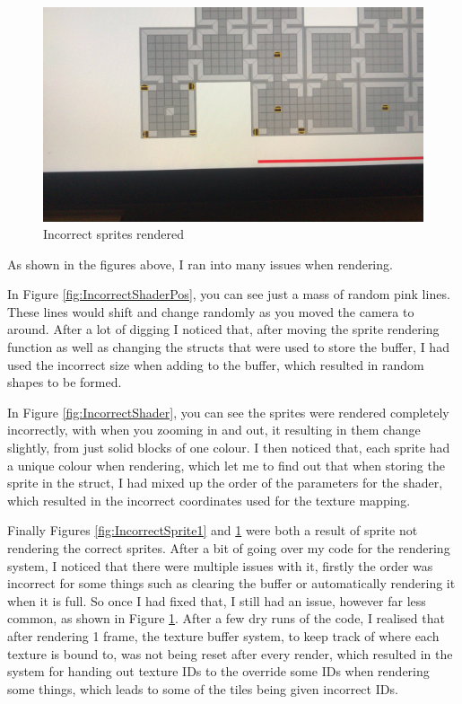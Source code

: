 \documentclass[../Main.tex]{subfiles}
\begin{document}
            \clearpage
            \begin{figure}[hbt!]
                \centerline{\includegraphics[scale=0.09]{img/Testing/General/Not refreshing buffer.jpg}}
                \caption{Incorrect sprites rendered}
                \label{fig:IncorrectSprite2}
            \end{figure}
            As shown in the figures above, I ran into many issues when rendering.

            In Figure \ref{fig:IncorrectShaderPos}, you can see just a mass of random pink lines. These lines would shift and change randomly as you moved the camera to around. After a lot of digging I noticed that, after moving the sprite rendering function as well as changing the structs that were used to store the buffer, I had used the incorrect size when adding to the buffer, which resulted in random shapes to be formed.

            In Figure \ref{fig:IncorrectShader}, you can see the sprites were rendered completely incorrectly, with when you zooming in and out, it resulting in them change slightly, from just solid blocks of one colour. I then noticed that, each sprite had a unique colour when rendering, which let me to find out that when storing the sprite in the struct, I had mixed up the order of the parameters for the shader, which resulted in the incorrect coordinates used for the texture mapping.

            Finally Figures \ref{fig:IncorrectSprite1} and \ref{fig:IncorrectSprite2} were both a result of sprite not rendering the correct sprites. After a bit of going over my code for the rendering system, I noticed that there were multiple issues with it, firstly the order was incorrect for some things such as clearing the buffer or automatically rendering it when it is full. So once I had fixed that, I still had an issue, however far less common, as shown in Figure \ref{fig:IncorrectSprite2}. After a few dry runs of the code, I realised that after rendering 1 frame, the texture buffer system, to keep track of where each texture is bound to, was not being reset after every render, which resulted in the system for handing out texture IDs to the override some IDs when rendering some things, which leads to some of the tiles being given incorrect IDs.
\end{document}
